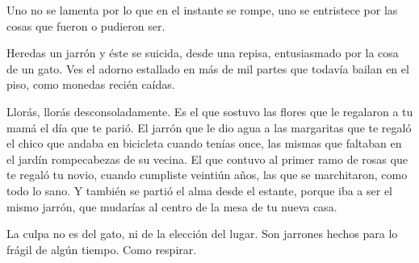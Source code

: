 
Uno no se lamenta por lo que en el instante se rompe, uno se entristece
por las cosas que fueron o pudieron ser.

Heredas un jarrón y éste se suicida, desde una repisa, entusiasmado por
la cosa de un gato. Ves el adorno estallado en más de mil partes que
todavía bailan en el piso, como monedas recién caídas.

Llorás, llorás desconsoladamente. Es el que sostuvo las flores que le 
regalaron a tu mamá el día que te parió. El jarrón que le dio agua a las
margaritas que te regaló el chico que andaba en bicicleta cuando tenías
once, las mismas que faltaban en el jardín rompecabezas de su vecina. El
que contuvo al primer ramo de rosas que te regaló tu novio, cuando
cumpliste veintiún años, las que se marchitaron, como todo lo sano. Y 
también se partió el alma desde el estante, porque iba a ser el mismo
jarrón, que mudarías al centro de la mesa de tu nueva casa.

La culpa no es del gato, ni de la elección del lugar. Son jarrones hechos
para lo frágil de algún tiempo. Como respirar.

